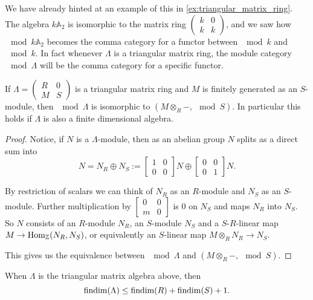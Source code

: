 We have already hinted at an example of this in \cref{ex:triangular_matrix_ring}. The algebra $k\mathbb A_2$ is isomorphic to the matrix ring $\begin{pmatrix}
k & 0\\
k & k
\end{pmatrix}$, and we saw how $\mod k\mathbb A_2$ becomes the comma category for a functor between $\mod k$ and $\mod k$. In fact whenever $\Lambda$ is a triangular matrix ring, the module category $\mod \Lambda$ will be the comma category for a specific functor.

\begin{prop}\label{prop:triangular_matrix_is_comma_cat}
	If $\Lambda = \begin{pmatrix}
	R & 0\\
	M & S
	\end{pmatrix}$ is a triangular matrix ring and $M$ is finitely generated as an $S$-module, then $\mod \Lambda$ is isomorphic to $(M \otimes_R -, \mod S)$. In particular this holds if $\Lambda$ is also a finite dimensional algebra.
	\begin{proof}
		Notice, if $N$ is a $\Lambda$-module, then as an abelian group $N$ splits as a direct sum into
		$$N= N_R \oplus N_S :=
		\begin{bmatrix}
		1 & 0\\
		0 & 0
		\end{bmatrix}N \oplus
		\begin{bmatrix}
		0 & 0\\
		0 & 1
		\end{bmatrix}N.$$
		
		By restriction of scalars we can think of $N_R$ as an $R$-module and $N_S$ as an $S$-module. Further multiplication by $\begin{bmatrix}
		0 & 0\\
		m & 0
		\end{bmatrix}$ is 0 on $N_S$ and maps $N_R$ into $N_S$. So $N$ consists of an $R$-module $N_R$, an $S$-module $N_S$ and a $S$-$R$-linear map $M \to \operatorname{Hom}_\mathbb{Z}(N_R, N_S)$, or equivalently an $S$-linear map $M \otimes_R N_R \to N_S$.
		
		This gives us the equivalence between $\mod \Lambda$ and $(M \otimes_R -, \mod S)$.
	\end{proof}
\end{prop} 

\begin{cor}
	When $\Lambda$ is the triangular matrix algebra above, then 
	$$\operatorname{findim}(\Lambda) \leq \operatorname{findim}(R) + \operatorname{findim}(S)+1.$$
\end{cor}

